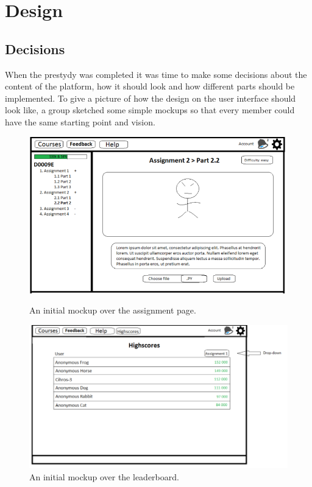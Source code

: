 \documentclass[a4paper,12pt]{article}
\begin{document}
\section{Design}
\subsection{Decisions} 
When the prestydy was completed it was time to make some decisions about the content of the platform, how it should look and how different parts should be implemented. To give a picture of how the design on the user interface should look like, a group sketched some simple mockups
so that every member could have the same starting point and vision. 

\begin{figure}[H]
  \centering
  \begin{minipage}[b]{0.7\textwidth}
    \includegraphics[width=\textwidth]{img/mockup1.png}
    \caption{An initial mockup over the assignment page.}
  \end{minipage}
  \hfill
  \begin{minipage}[b]{0.7\textwidth}
    \includegraphics[width=\textwidth]{img/mockup2.png}
    \caption{An initial mockup over the leaderboard.}
  \end{minipage}
\end{figure}
\end{document}

